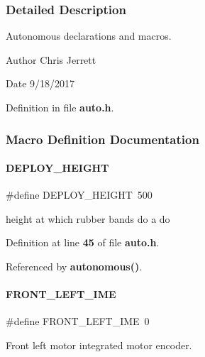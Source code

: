 \subsubsection{Detailed Description}
Autonomous declarations and macros. 

\begin{DoxyAuthor}{Author}
Chris Jerrett 
\end{DoxyAuthor}
\begin{DoxyDate}{Date}
9/18/2017 
\end{DoxyDate}


Definition in file \textbf{ auto.\+h}.



\subsubsection{Macro Definition Documentation}
\mbox{\label{a00002_afe2ab4383f3cf46d67e74834f691976f}} 
\paragraph{D\+E\+P\+L\+O\+Y\+\_\+\+H\+E\+I\+G\+HT}
{\footnotesize\ttfamily \#define D\+E\+P\+L\+O\+Y\+\_\+\+H\+E\+I\+G\+HT~500}



height at which rubber bands do a do 



Definition at line \textbf{ 45} of file \textbf{ auto.\+h}.



Referenced by \textbf{ autonomous()}.

\mbox{\label{a00002_a7bc3203ebc61f8414788156a8616047c}} 
\paragraph{F\+R\+O\+N\+T\+\_\+\+L\+E\+F\+T\+\_\+\+I\+ME}
{\footnotesize\ttfamily \#define F\+R\+O\+N\+T\+\_\+\+L\+E\+F\+T\+\_\+\+I\+ME~0}



Front left motor integrated motor encoder. 



